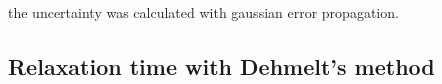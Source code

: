 \documentclass{article}
\begin{document}
the uncertainty was calculated with gaussian error propagation.
\subsection{Relaxation time with Dehmelt’s method}
\end{document}
